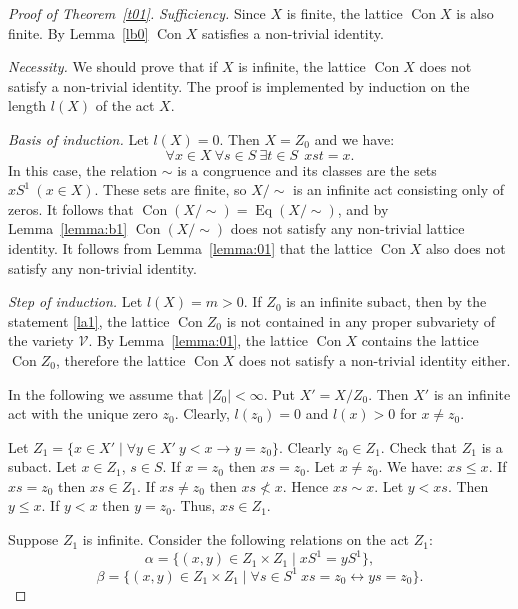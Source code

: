 \documentclass{birkau}
\numberwithin{equation}{section}
\theoremstyle{plain}
\theoremstyle{definition}
\DeclareMathOperator{\Con}{Con}
\DeclareMathOperator{\Eq}{Eq}
\begin{document}
	\begin{proof}[Proof of Theorem~\ref{t01}]
	    \textit{Sufficiency.} Since $X$ is finite, the lattice $\Con X$ is also finite. By Lemma~\ref{lb0} $\Con X$ satisfies a non-trivial identity.
	
		\textit{Necessity.} We should prove that if $X$ is infinite, the lattice $\Con X$ does not satisfy a non-trivial identity. The proof is implemented by induction on the length $l(X)$ of the act $X$.
		
		\textit{Basis of induction.} Let $l(X) = 0$. Then $X = Z_0$ and we have: $$ \forall x \in X \ \forall s \in S \ \exists t \in S \ \ xst = x. $$ In this case, the relation $\sim$ is a congruence and its classes are the sets $xS^1\ (x \in X)$. These sets are finite, so ${X}/{\sim}$ is an infinite act consisting only of zeros. It follows that $\Con({X}/{\sim})=\Eq({X}/{\sim})$, and by Lemma~\ref{lemma:b1} $\Con({X}/{\sim})$ does not satisfy any non-trivial lattice identity. It follows from Lemma~\ref{lemma:01} that the lattice $\Con X$ also does not satisfy any non-trivial identity.
		
		\textit{Step of induction.} Let $l(X) = m > 0$. If $Z_0$ is an infinite subact, then by the statement \ref{la1}, the lattice $\Con Z_0$ is not contained in any proper subvariety of the variety $\mathcal{V}$. By Lemma~\ref{lemma:01}, the lattice $\Con X$ contains the lattice $\Con Z_0$, therefore the lattice $\Con X$ does not satisfy a non-trivial identity either.
		
		In the following we assume that $|Z_0| < \infty$. Put $X'={X}/{Z_0}$. Then $X'$ is an infinite act with the unique zero $z_0$. Clearly,  $l(z_0) = 0$ and $l(x) > 0$ for $x \neq z_0$.
		
		Let $Z_1 = \{x \in X' \mid \forall y  \in X' \ y < x \rightarrow y = z_0\}$. Clearly $z_0 \in Z_1$. Check that $Z_1$ is a subact. Let $x \in Z_1$, $s \in S$. If $x = z_0$ then $xs = z_0$. Let $x \neq z_0$. We have: $xs \leqslant x$. If $xs = z_0$ then $xs \in Z_1$. If $xs \neq z_0$ then $xs \not < x$. Hence $xs \sim x$. Let $y < xs$. Then $y \leqslant x$. If $y < x$ then $y = z_0$. Thus, $xs \in Z_1$.
		
		Suppose $ Z_1 $ is infinite. Consider the following relations on the act $Z_1$: $$ \alpha = \{ (x,y) \in Z_1 \times Z_1 \mid xS^1 = yS^1 \}, $$ $$ \beta = \{ (x,y) \in Z_1 \times Z_1 \mid \forall s \in S^1 \ xs = z_0 \leftrightarrow ys = z_0 \}. $$
		

\end{proof}
\end{document}
